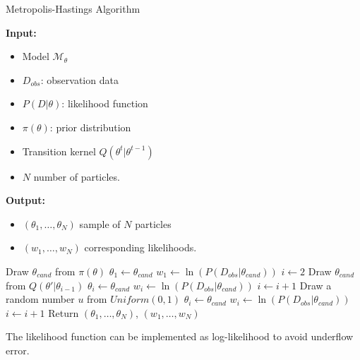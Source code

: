 \begin{algorithm}[H]
    \caption{Metropolis-Hastings Algorithm}
    \label{alg:mh}
    \footnotesize{
        \hspace*{\algorithmicindent} \textbf{Input:}
        \begin{itemize}[noitemsep,topsep=0pt]
            \item Model $\mathcal{M}_\theta$
            \item $D_{obs}$: observation data
            \item $P(D|\theta)$: likelihood function
            \item $\pi(\theta)$: prior distribution
            \item Transition kernel $Q(\theta^t|\theta^{t-1})$
            \item $N$ number of particles.
        \end{itemize}
        \hspace*{\algorithmicindent} \textbf{Output:}
        \begin{itemize}[noitemsep,topsep=0pt]
            \item $(\theta_1,\ldots,\theta_N)$ sample of $N$ particles
            \item $(w_1,\ldots,w_N)$ corresponding likelihoods.
        \end{itemize}
    }
    \begin{algorithmic}[1]
        \State Draw $\theta_{cand}$ from $\pi(\theta)$
        \State $\theta_1 \leftarrow  \theta_{cand}$
        \State $w_1 \leftarrow  \ln(P(D_{obs}|\theta_{cand}))$
        \State $i \leftarrow 2$
        \State Draw $\theta_{cand}$ from $Q(\theta'|\theta_{i-1})$
        \State $\theta_i \leftarrow \theta_{cand}$
        \State $w_i \leftarrow \ln(P(D_{obs}|\theta_{cand}))$
        \State $i \leftarrow i + 1$
        \Else
        \State Draw a random number $u$ from $Uniform(0,1)$
        \State $\theta_i \leftarrow \theta_{cand}$
        \State $w_i \leftarrow \ln(P(D_{obs}|\theta_{cand}))$
        \State $i \leftarrow i + 1$
        \EndIf
        \EndIf
        \EndWhile
        \State Return $(\theta_1,\ldots,\theta_{N})$, $(w_1,\ldots,w_{N})$
        \EndProcedure
    \end{algorithmic}
\end{algorithm}
\noindent The likelihood function can be implemented as log-likelihood to avoid underflow error.
